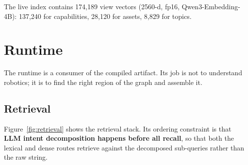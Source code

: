 \documentclass[10pt,a4paper]{article}
\begin{document}
The live index contains 174{,}189 view vectors (2560-d, fp16, Qwen3-Embedding-4B):
137{,}240 for capabilities, 28{,}120 for assets, 8{,}829 for topics.

\section{Runtime}
\label{sec:runtime}

The runtime is a consumer of the compiled artifact. Its job is not to understand
robotics; it is to find the right region of the graph and assemble it.

\subsection{Retrieval}

Figure~\ref{fig:retrieval} shows the retrieval stack. Its ordering constraint is
that \textbf{LLM intent decomposition happens before all recall}, so that both the
lexical and dense routes retrieve against the decomposed sub-queries rather than
the raw string.
\end{document}
